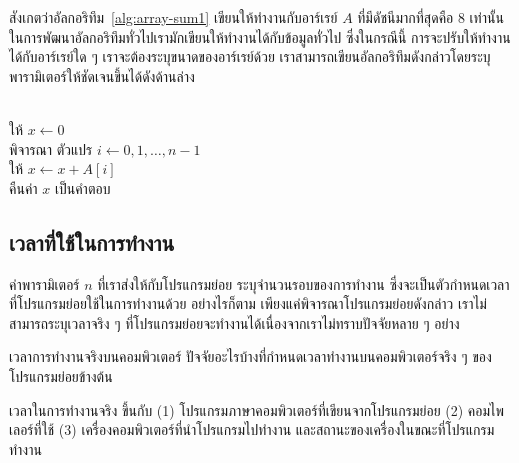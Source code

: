 สังเกต{\wbr}ว่า{\wbr}อัลกอริทึม~\ref{alg:array-sum1} เขียน{\wbr}ให้{\wbr}ทำงาน{\wbr}กับ{\wbr}อาร์{\wbr}เรย์ $A$
ที่{\wbr}มี{\wbr}ดัชนี{\wbr}มาก{\wbr}ที่สุด{\wbr}คือ 8 เท่านั้น ใน{\wbr}การ{\wbr}พัฒนา{\wbr}อัลกอริทึม{\wbr}ทั่วไป{\wbr}เรา{\wbr}มัก{\wbr}เขียน{\wbr}ให้{\wbr}ทำงาน{\wbr}ได้{\wbr}กับ{\wbr}ข้อมูล{\wbr}ทั่วไป{\wbr}
ซึ่ง{\wbr}ใน{\wbr}กรณี{\wbr}นี้ การ{\wbr}จะ{\wbr}ปรับ{\wbr}ให้{\wbr}ทำงาน{\wbr}ได้{\wbr}กับ{\wbr}อาร์{\wbr}เรย์{\wbr}ใด ๆ เรา{\wbr}จะ{\wbr}ต้อง{\wbr}ระบุ{\wbr}ขนาด{\wbr}ของ{\wbr}อาร์{\wbr}เรย์{\wbr}ด้วย{\wbr}
เรา{\wbr}สามารถ{\wbr}เขียน{\wbr}อัลกอริทึม{\wbr}ดัง{\wbr}กล่าว{\wbr}โดย{\wbr}ระบุ{\wbr}พารามิเตอร์{\wbr}ให้{\wbr}ชัดเจน{\wbr}ขึ้น{\wbr}ได้{\wbr}ดัง{\wbr}ด้าน{\wbr}ล่าง{\wbr}

\begin{algt}
\label{alg:array-sum2}
\\
\hspace*{0.2in} ให้ $x\leftarrow 0$\\
\hspace*{0.2in} พิจารณา ตัวแปร $i\leftarrow 0,1,\ldots,n-1$\\
\hspace*{0.2in}\hspace*{0.2in} ให้ $x \leftarrow x + A[i]$\\
\hspace*{0.2in} คืน{\wbr}ค่า $x$ เป็น{\wbr}คำ{\wbr}ตอบ{\wbr}
\end{algt}

\subsection{เวลา{\wbr}ที่{\wbr}ใช้{\wbr}ใน{\wbr}การ{\wbr}ทำงาน}

ค่า{\wbr}พารามิเตอร์ $n$ ที่{\wbr}เรา{\wbr}ส่ง{\wbr}ให้{\wbr}กับ{\wbr}โปรแกรม{\wbr}ย่อย ระบุ{\wbr}จำนวน{\wbr}รอบ{\wbr}ของ{\wbr}การ{\wbr}ทำงาน{\wbr}
ซึ่ง{\wbr}จะ{\wbr}เป็น{\wbr}ตัว{\wbr}กำหนด{\wbr}เวลา{\wbr}ที่{\wbr}โปรแกรม{\wbr}ย่อย{\wbr}ใช้{\wbr}ใน{\wbr}การ{\wbr}ทำงาน{\wbr}ด้วย อย่างไร{\wbr}ก็{\wbr}ตาม{\wbr}
เพียง{\wbr}แค่{\wbr}พิจารณา{\wbr}โปรแกรม{\wbr}ย่อย{\wbr}ดัง{\wbr}กล่าว เรา{\wbr}ไม่{\wbr}สามารถ{\wbr}ระบุ{\wbr}เวลา{\wbr}จริง ๆ
ที่{\wbr}โปรแกรม{\wbr}ย่อย{\wbr}จะ{\wbr}ทำงาน{\wbr}ได้{\wbr}เนื่อง{\wbr}จาก{\wbr}เรา{\wbr}ไม่{\wbr}ทราบ{\wbr}ปัจจัย{\wbr}หลาย ๆ อย่าง{\wbr}

\begin{quiz}{เวลา{\wbr}การ{\wbr}ทำงาน{\wbr}จริง{\wbr}บน{\wbr}คอมพิวเตอร์}
ปัจจัย{\wbr}อะไร{\wbr}บ้าง{\wbr}ที่{\wbr}กำหนด{\wbr}เวลา{\wbr}ทำงาน{\wbr}บน{\wbr}คอมพิวเตอร์{\wbr}จริง ๆ ของ{\wbr}โปรแกรม{\wbr}ย่อย{\wbr}ข้าง{\wbr}ต้น{\wbr}
\end{quiz}
\begin{quizans}
เวลา{\wbr}ใน{\wbr}การ{\wbr}ทำงาน{\wbr}จริง ขึ้น{\wbr}กับ (1) โปรแกรม{\wbr}ภาษา{\wbr}คอมพิวเตอร์{\wbr}ที่{\wbr}เขียน{\wbr}จาก{\wbr}โปรแกรม{\wbr}ย่อย (2)
คอมไพเลอร์{\wbr}ที่{\wbr}ใช้ (3) เครื่อง{\wbr}คอมพิวเตอร์{\wbr}ที่{\wbr}นำ{\wbr}โปรแกรม{\wbr}ไป{\wbr}ทำงาน{\wbr}
และ{\wbr}สถานะ{\wbr}ของ{\wbr}เครื่องใน{\wbr}ขณะ{\wbr}ที่{\wbr}โปรแกรม{\wbr}ทำงาน  
\end{quizans}

